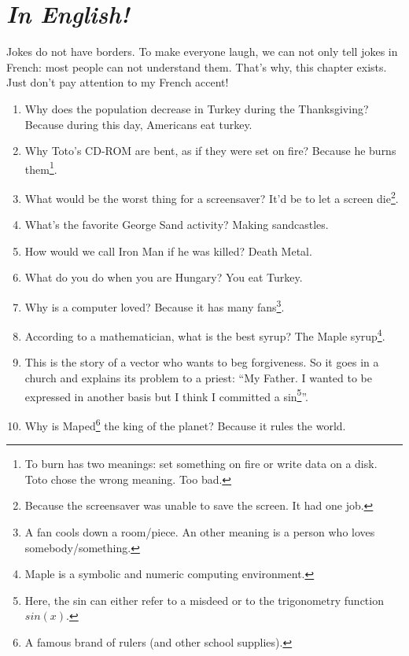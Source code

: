 \documentclass[10pt,a5paper,fullpage]{book}
\begin{document}
	\chapter{\textit{In English!}}
	Jokes do not have borders. To make everyone laugh, we can not only tell jokes in French: most people can not understand them. That's why, this chapter exists. 
	\\Just don't pay attention to my French accent!
	\newpage
	\begin{enumerate}
		\item Why does the population decrease in Turkey during the Thanksgiving? Because during this day, Americans eat turkey.
		
		\item Why Toto’s CD-ROM are bent, as if they were set on fire? Because he burns them\footnote{To burn has two meanings: set something on fire or write data on a disk. Toto chose the wrong meaning. Too bad.}. 
		
		\item What would be the worst thing for a screensaver? It’d be to let a screen die\footnote{Because the screensaver was unable to save the screen. It had one job.}. 
		
		\item What's the favorite George Sand activity? Making sandcastles.
		
		\item How would we call Iron Man if he was killed? Death Metal. 
		
		\item What do you do when you are Hungary? You eat Turkey.
		
		\item Why is a computer loved? Because it has many fans\footnote{A fan cools down a room/piece. An other meaning is a person who loves somebody/something.}.
		
		\item According to a mathematician, what is the best syrup? The Maple syrup\footnote{Maple is a symbolic and numeric computing environment.}.
		
		\item This is the story of a vector who wants to beg forgiveness. So it goes in a church and explains its problem to a priest: “My Father. I wanted to be expressed in another basis but I think I committed a sin\footnote{Here, the sin can either refer to a misdeed or to the trigonometry function $sin(x)$.}”.
		
		\item Why is Maped\footnote{A famous brand of rulers (and other school supplies).} the king of the planet? Because it rules the world.
		

\end{enumerate}
\end{document}
